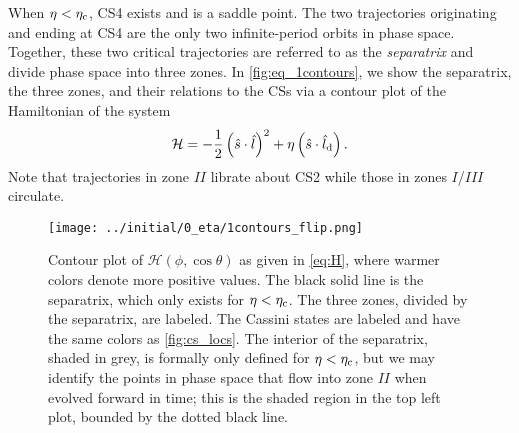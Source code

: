 \documentclass[
        fleqn,
        usenatbib,
        referee,
    ]{mnras}
\newcommand*{\p}[1]{\left(#1\right)}
\begin{document}
When $\eta < \eta_{\rm c}$, CS4 exists and is a saddle point. The two trajectories
originating and ending at CS4 are the only two infinite-period orbits in phase
space. Together, these two critical trajectories are referred to as the
\emph{separatrix} and divide phase space into three zones. In
\autoref{fig:eq_1contours}, we show the separatrix, the three zones, and their
relations to the CSs via a contour plot of the Hamiltonian of the system
\begin{equation}
    \mathcal{H} = -\frac{1}{2}\p{\hat{s} \cdot \hat{l}}^2
            + \eta \p{\hat{s} \cdot \hat{l}_{\rm d}}.\label{eq:H}
\end{equation}
Note that trajectories in zone $II$ librate about CS2 while those in zones
$I$/$III$ circulate.
\begin{figure*}
    \centering
    \texttt{[image: ../initial/0\_eta/1contours\_flip.png]}
    \caption{Contour plot of $\mathcal{H}\p{\phi, \cos \theta}$ as given in
    \autoref{eq:H}, where warmer colors denote more positive values. The black
    solid line is the separatrix, which only exists for $\eta < \eta_{\rm c}$.
    The three zones, divided by the separatrix, are labeled. The Cassini states
    are labeled and have the same colors as \autoref{fig:cs_locs}. The interior
    of the separatrix, shaded in grey, is formally only defined for $\eta <
    \eta_{\rm c}$, but we may identify the points in phase space that flow into
    zone $II$ when evolved forward in time; this is the shaded region in the top
    left plot, bounded by the dotted black line.}\label{fig:eq_1contours}
\end{figure*}
\end{document}
